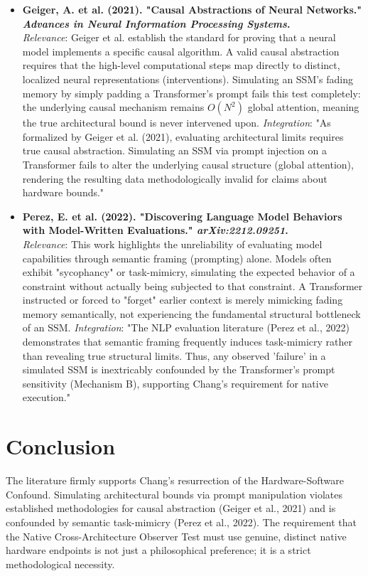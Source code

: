 \documentclass[12pt]{article}
\begin{document}
\begin{itemize}
    \item \textbf{Geiger, A. et al. (2021). "Causal Abstractions of Neural Networks." \textit{Advances in Neural Information Processing Systems}.} \\
    \textit{Relevance}: Geiger et al. establish the standard for proving that a neural model implements a specific causal algorithm. A valid causal abstraction requires that the high-level computational steps map directly to distinct, localized neural representations (interventions). Simulating an SSM's fading memory by simply padding a Transformer's prompt fails this test completely: the underlying causal mechanism remains $O(N^2)$ global attention, meaning the true architectural bound is never intervened upon.
    \textit{Integration}: "As formalized by Geiger et al. (2021), evaluating architectural limits requires true causal abstraction. Simulating an SSM via prompt injection on a Transformer fails to alter the underlying causal structure (global attention), rendering the resulting data methodologically invalid for claims about hardware bounds."

    \item \textbf{Perez, E. et al. (2022). "Discovering Language Model Behaviors with Model-Written Evaluations." \textit{arXiv:2212.09251}.} \\
    \textit{Relevance}: This work highlights the unreliability of evaluating model capabilities through semantic framing (prompting) alone. Models often exhibit "sycophancy" or task-mimicry, simulating the expected behavior of a constraint without actually being subjected to that constraint. A Transformer instructed or forced to "forget" earlier context is merely mimicking fading memory semantically, not experiencing the fundamental structural bottleneck of an SSM.
    \textit{Integration}: "The NLP evaluation literature (Perez et al., 2022) demonstrates that semantic framing frequently induces task-mimicry rather than revealing true structural limits. Thus, any observed 'failure' in a simulated SSM is inextricably confounded by the Transformer's prompt sensitivity (Mechanism B), supporting Chang's requirement for native execution."
\end{itemize}

\section{Conclusion}
The literature firmly supports Chang's resurrection of the Hardware-Software Confound. Simulating architectural bounds via prompt manipulation violates established methodologies for causal abstraction (Geiger et al., 2021) and is confounded by semantic task-mimicry (Perez et al., 2022). The requirement that the Native Cross-Architecture Observer Test must use genuine, distinct native hardware endpoints is not just a philosophical preference; it is a strict methodological necessity.
\end{document}
